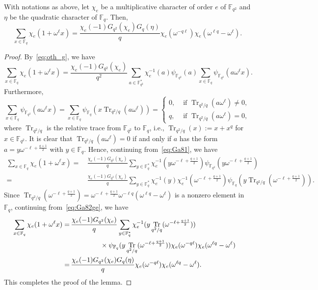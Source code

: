 \documentclass[ALCO,ThmDefs,Unicode]{cedram}
\DeclareMathOperator{\Tr}{Tr}
\newcommand*\F{{\mathbb F}}
\begin{document}
\begin{lemm}\label{lem:charac_ge}
With notations as above, let $\chi_e$ be a multiplicative character of order $e$ of $\F_{q^2}$ and $\eta$ be the quadratic character of $\F_{q}$. Then,
\[
\sum_{x\in \F_q}\chi_e(1+\omega^\ell x)=\frac{\chi_e(-1)G_{q^2}(\chi_e)G_q(\eta)}{q}\chi_e(\omega^{-q\ell})\chi_e(\omega^{\ell q}-\omega^{\ell}).
\]
\end{lemm}
\begin{proof}
By~\eqref{eq:oth_g}, we have
\begin{equation}\label{eq:Ga81}
\sum_{x\in \F_q}\chi_e(1+\omega^\ell x)=
\frac{\chi_e(-1)G_{q^2}(\chi_e)}{q^2}\sum_{a\in \F_{q^2}^\ast}\chi_e^{-1}(a)\psi_{\F_{q^2}}(a)\sum_{x\in \F_q}\psi_{\F_{q^2}}(a \omega^\ell x).
\end{equation}
Furthermore,
\[
\sum_{x\in \F_q}\psi_{\F_{q^2}}(a \omega^\ell x)=
\sum_{x\in \F_q}\psi_{\F_q}(x\Tr_{q^2/q}(a \omega^\ell))=
\begin{cases}
0,& \text{ if } \Tr_{q^2/q}(a\omega^\ell)\not=0,\\
q,& \text{ if } \Tr_{q^2/q}(a\omega^\ell)=0,
\end{cases}
\]
where $\Tr_{q^2/q}$ is the relative trace from $\F_{q^2}$ to $\F_q$, i.e., $\Tr_{q^2/q}(x):=x+x^q$ for $x\in \F_{q^2}$. It is clear that $\Tr_{q^2/q}(a\omega^\ell)=0$ if and only if $a$ has the form $a=y\omega^{-\ell+\frac{q+1}{2}}$ with $y\in \F_q$. Hence, continuing from~\eqref{eq:Ga81}, we have
\begin{align}
\sum_{x\in \F_q}\chi_e(1+\omega^\ell x)=&\,
\frac{\chi_e(-1)G_{q^2}(\chi_e)}{q}\sum_{y\in \F_q^\ast}\chi_e^{-1}(y\omega^{-\ell+\frac{q+1}{2}})\psi_{\F_{q^2}}(y\omega^{-\ell+\frac{q+1}{2}})\nonumber\\
=&\, \frac{\chi_e(-1)G_{q^2}(\chi_e)}{q}\sum_{y\in \F_q^\ast}\chi_e^{-1}(y)\chi_e^{-1}(\omega^{-\ell+\frac{q+1}{2}})\psi_{\F_{q}}(y\Tr_{q^2/q}(\omega^{-\ell+\frac{q+1}{2}})). \label{eq:Ga82ge}
\end{align}
Since $\Tr_{q^2/q}(\omega^{-\ell+\frac{q+1}{2}})=\omega^{-\ell+\frac{q+1}{2}}\omega^{-\ell q}(\omega^{\ell q}-\omega^{\ell})$ is a nonzero element in $\F_q$, continuing from~\eqref{eq:Ga82ge}, we have
\begin{align*}
\sum_{x\in \F_q}\chi_e(1+\omega^\ell x)=&\,
\frac{\chi_e(-1)G_{q^2}(\chi_e)}{q}\sum_{y\in \F_q^\ast}\chi_e^{-1}(y\Tr_{q^2/q}(\omega^{-\ell+\frac{q+1}{2}}))\\
&\mkern 80mu\times\psi_{\F_q}(y\Tr_{q^2/q}(\omega^{-\ell+\frac{q+1}{2}}))\chi_e(\omega^{-q\ell})
\chi_e(\omega^{\ell q}-\omega^\ell)\phantom{\frac.\int}\\
=&\,
\frac{\chi_e(-1)G_{q^2}(\chi_e)G_q(\eta)}{q}\chi_e(\omega^{-q\ell})
\chi_e(\omega^{\ell q}-\omega^\ell).
\end{align*}
This completes the proof of the lemma.
\end{proof}
\end{document}
